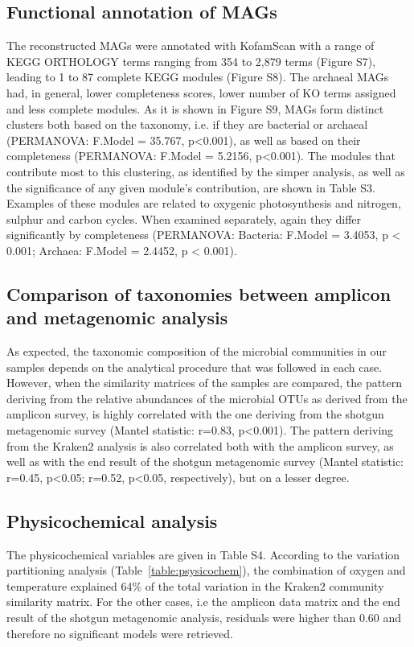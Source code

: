 \subsection{Functional annotation of MAGs}

   The reconstructed MAGs were annotated with KofamScan with a range of KEGG ORTHOLOGY terms ranging from 354 to 2,879 terms (Figure S7), leading to 1 to 87 complete KEGG modules (Figure S8).
   The archaeal MAGs had, in general, lower completeness scores, lower number of KO terms assigned and less complete modules.
   As it is shown in Figure S9, MAGs form distinct clusters both based on the taxonomy, i.e. if they are bacterial or archaeal (PERMANOVA: F.Model = 35.767, p<0.001), 
   as well as based on their completeness (PERMANOVA: F.Model = 5.2156, p<0.001). 
   The modules that contribute most to this clustering, as identified by the simper analysis, as well as the significance of any given module’s contribution, are shown in Table S3. 
   Examples of these modules are related to oxygenic photosynthesis and nitrogen, sulphur and carbon cycles. 
   When examined separately, again they differ significantly by completeness (PERMANOVA: Bacteria: F.Model = 3.4053, p < 0.001; Archaea: F.Model = 2.4452, p < 0.001).


\subsection{Comparison of taxonomies between amplicon and metagenomic analysis}

   As expected, the taxonomic composition of the microbial communities in our samples depends on the analytical procedure that was followed in each case. 
   However, when the similarity matrices of the samples are compared, the pattern deriving from the relative abundances of the microbial OTUs as derived from the amplicon survey, 
   is highly correlated with the one deriving from the shotgun metagenomic survey (Mantel statistic: r=0.83, p<0.001). 
   The pattern deriving from the Kraken2 analysis is also correlated both with the amplicon survey, as well as with the end result of the shotgun metagenomic survey 
   (Mantel statistic: r=0.45, p<0.05; r=0.52, p<0.05, respectively), but on a lesser degree. 


\subsection{Physicochemical analysis}

   The physicochemical variables are given in Table S4. 
   According to the variation partitioning analysis (Table~\ref{table:psysicochem}), the combination of oxygen and temperature explained 64\% of the total variation 
   in the Kraken2 community similarity matrix. 
   For the other cases, i.e the amplicon data matrix and the end result of the shotgun metagenomic analysis, residuals were higher than 0.60 and therefore no significant models were retrieved.


